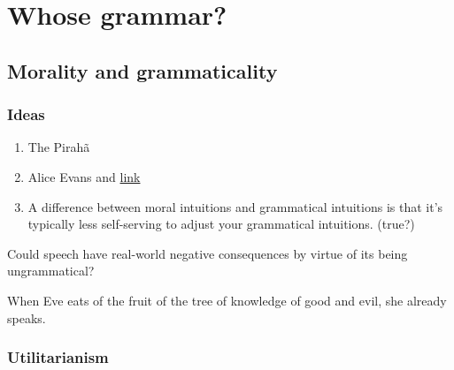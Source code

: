 \chapter{Whose grammar?}



\section{Morality and grammaticality}


\subsection{Ideas}
\begin{enumerate}
    \item The Pirahã
    \item Alice Evans and \href{https://www.youtube.com/watch?v=6gC8Mi_sOQU}{link}
    \item A difference between moral intuitions and grammatical intuitions is that it's typically less self-serving to adjust your grammatical intuitions. (true?)
\end{enumerate}

Could speech have real-world negative consequences by virtue of its being ungrammatical?

When Eve eats of the fruit of the tree of knowledge of good and evil, she already speaks.

\subsection{Utilitarianism}

